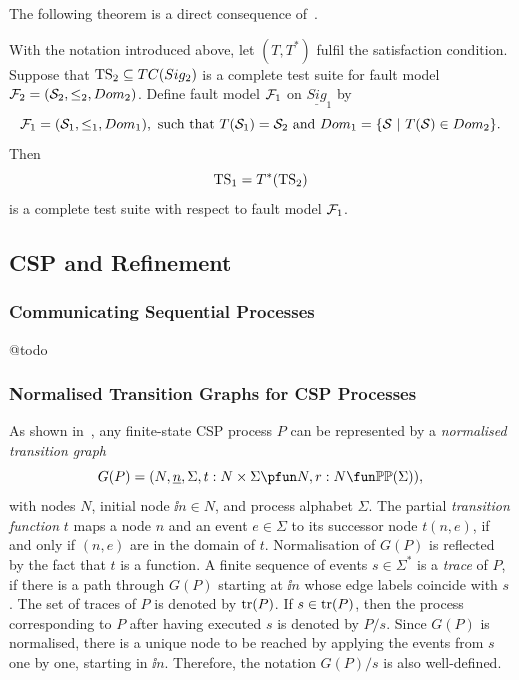  


 The following theorem is a direct consequence of~\cite[Theorem~2.1]{Huang2017}.

\begin{theorem}\label{th:theorytranslation}
With the notation introduced above, let  $(T,T^*)$ fulfil the satisfaction condition.
Suppose that ${\text{TS}}_2 \subseteq TC(Sig_2)$ is a complete test suite
for fault model ${\cal F}_2 = ({\cal S}_2,\le_2,Dom_2)$. Define fault model ${\cal F}_1$ on 
$\underline{Sig}_1$ by
$$
{\cal F}_1 = ({\cal S}_1,\le_1,Dom_1),\ \text{such that}\
T({\cal S}_1)  =  {\cal S}_2\ \text{and}\
Dom_1  =  \{ {\cal S}~|~T({\cal S})\in Dom_2 \}.
$$
Then
$$
{\text{TS}}_1 = T^*({\text{TS}}_2)
$$
is a complete test suite with respect to fault model ${\cal F}_1$.
\xbox
\end{theorem}

 
 


\subsection{CSP and Refinement}

\subsubsection*{Communicating Sequential Processes} @todo

\subsubsection*{Normalised Transition Graphs for CSP Processes}
\label{sec:ntg}

As shown in~\cite{Roscoe:1994:CME:197600}, any finite-state CSP process $P$ can be represented by a \emph{normalised transition graph} 
$$
G(P) = ( N, \ii n, \Sigma, t : N\times\Sigma \pfun N, r : N \fun \mathbb{P}\mathbb{P}(\Sigma)),
$$
with nodes $N$, initial node $\ii n\in N$, and process alphabet $\Sigma$. The partial \emph{transition function} $t$ maps a node $n$ and an event $e\in\Sigma$ to its successor node $t(n,e)$, if and only if $(n,e)$ are in the domain of $t$. Normalisation of $G(P)$ is reflected 
by the fact that $t$ is a function. A finite sequence of events $s\in\Sigma^*$ 
is a \emph{trace} of $P$, if there is a path through $G(P)$ starting  at $\ii n$ whose edge labels coincide 
with $s$. The set of traces of $P$ is denoted by $\text{tr}(P)$. If $s\in\text{tr}(P)$, then the process corresponding to $P$ after having executed $s$ is denoted by $P/s$. Since
$G(P)$ is normalised, there is a unique node to be  reached by applying the events from
$s$ one by one, starting in $\ii n$. Therefore, the notation $G(P)/s$  is also well-defined.


